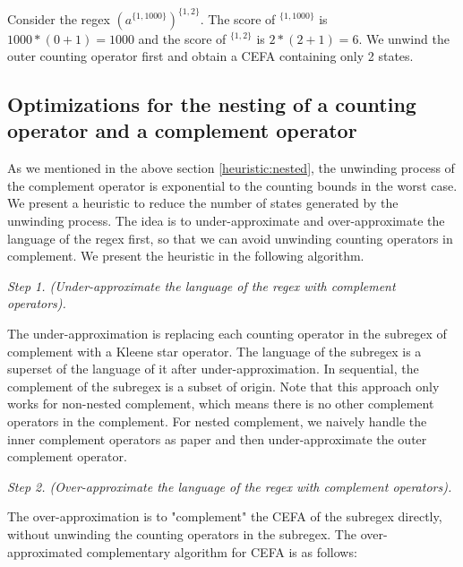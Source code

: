 \begin{example}
  Consider the regex $(a^{\{1,1000\}})^{\{1,2\}}$. The score of $^{\{1,1000\}}$ is $1000*(0+1) = 1000$ and the score of $^{\{1,2\}}$ is $2*(2+1) = 6$. We unwind the outer counting operator first and obtain a CEFA containing only 2 states.  
\end{example}

\subsection{Optimizations for the nesting of a counting operator and a complement operator}
As we mentioned in the above section \ref{heuristic:nested}, the unwinding process of the complement operator is exponential to the counting bounds in the worst case. We present a heuristic to reduce the number of states generated by the unwinding process. The idea is to under-approximate and over-approximate the language of the regex first, so that we can avoid unwinding counting operators in complement. We present the heuristic in the following algorithm.

\medskip
\noindent
\emph{Step 1. (Under-approximate the language of the regex with complement operators).}

The under-approximation is replacing each counting operator in the subregex of complement with a Kleene star operator. The language of the subregex is a superset of the language of it after under-approximation. In sequential, the complement of the subregex is a subset of origin. Note that this approach only works for non-nested complement, which means there is no other complement operators in the complement. For nested complement,  we naively handle the inner complement operators as paper \cite{Denghang2023} and then under-approximate the outer complement operator.

\medskip
\noindent
\emph{Step 2. (Over-approximate the language of the regex with complement operators).}

The over-approximation is to "complement" the CEFA of the subregex directly, without unwinding the counting operators in the subregex. The over-approximated complementary algorithm for CEFA is as follows:

